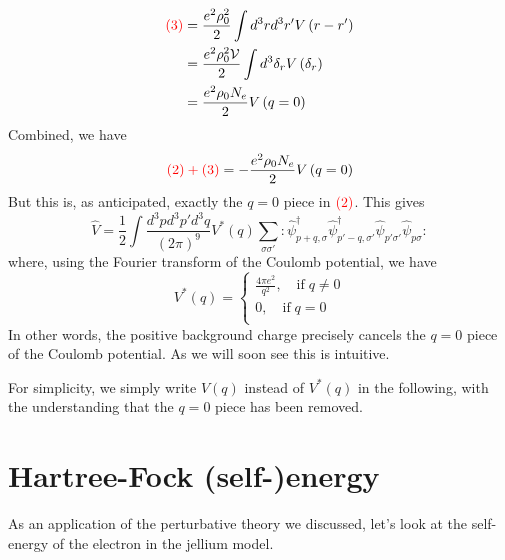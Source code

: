 \begin{align*}
    {\color{red} \left( 3 \right) }&=\frac{e^2\rho _{0}^{2}}{2}\int{d^3rd^3r'V\left( r-r' \right)}\\
    &=\frac{e^2\rho _{0}^{2}\mathcal{V}}{2}\int{d^3\delta _rV\left( \delta _r \right)}\\
    &=\frac{e^2\rho _0N_e}{2}V\left( q=0 \right)
\end{align*}
Combined, we have
\[ {\color{red} \left( 2 \right) +\left( 3 \right) }=-\frac{e^2\rho _0N_e}{2}V\left( q=0 \right) \]
But this is, as anticipated, exactly the $q=0$ piece in ${\color{red} \left( 2 \right)}$. This gives
\[ \hat{V}=\frac{1}{2}\int{\frac{d^3pd^3p'd^3q}{\left( 2\pi \right) ^9}V^*\left( q \right) \sum_{\sigma \sigma '}{:\hat{\psi}_{p+q,\sigma}^{\dagger}\hat{\psi}_{p'-q,\sigma '}^{\dagger}\hat{\psi}_{p'\sigma '}\hat{\psi}_{p\sigma}:}}\]
where, using the Fourier transform of the Coulomb potential, we have
\[ V^*\left( q \right) =\begin{cases}
	\frac{4\pi e^2}{q^2},\quad \mathrm{if}\; q\ne 0\\
	0,\quad \mathrm{if}\; q=0\\
\end{cases}\]
In other words, the positive background charge precisely cancels the $q=0$ piece of the Coulomb potential. As we will soon see this is intuitive.

For simplicity, we simply write $V(q)$ instead of $V^*(q)$ in the following, with the understanding that the $q=0$ piece has been removed.

\section{Hartree-Fock (self-)energy}

As an application of the perturbative theory we discussed, let's look at the self-energy of the electron in the jellium model.

